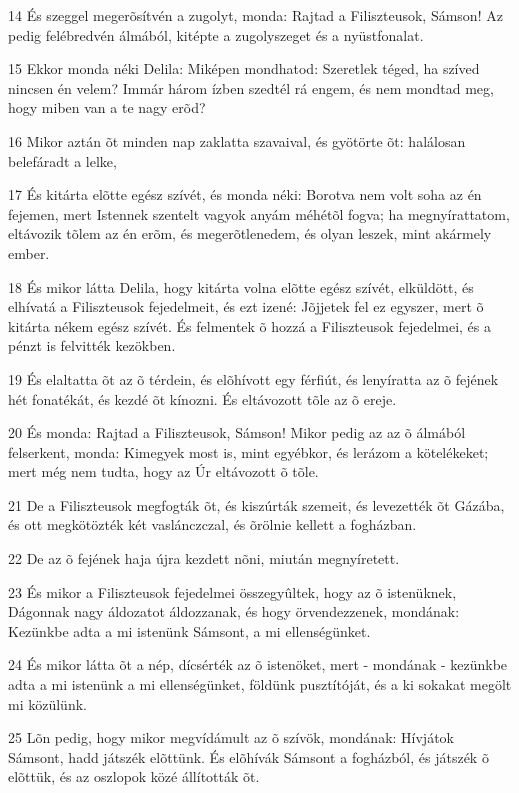 \par 14 És szeggel megerõsítvén a zugolyt, monda: Rajtad a Filiszteusok, Sámson! Az pedig felébredvén álmából, kitépte a zugolyszeget és a nyüstfonalat.
\par 15 Ekkor monda néki Delila: Miképen mondhatod: Szeretlek téged, ha szíved nincsen én velem? Immár három ízben szedtél rá engem, és nem mondtad meg, hogy miben van a te nagy erõd?
\par 16 Mikor aztán õt minden nap zaklatta szavaival, és gyötörte õt: halálosan belefáradt a lelke,
\par 17 És kitárta elõtte egész szívét, és monda néki: Borotva nem volt soha az én fejemen, mert Istennek szentelt vagyok anyám méhétõl fogva; ha megnyírattatom, eltávozik tõlem az én erõm, és megerõtlenedem, és olyan leszek, mint akármely ember.
\par 18 És mikor látta Delila, hogy kitárta volna elõtte egész szívét, elküldött, és elhívatá a Filiszteusok fejedelmeit, és ezt izené: Jõjjetek fel ez egyszer, mert õ kitárta nékem egész szívét. És felmentek õ hozzá a Filiszteusok fejedelmei, és a pénzt is felvitték kezökben.
\par 19 És elaltatta õt az õ térdein, és elõhívott egy férfiút, és lenyíratta az õ fejének hét fonatékát, és kezdé õt kínozni. És eltávozott tõle az õ ereje.
\par 20 És monda: Rajtad a Filiszteusok, Sámson! Mikor pedig az az õ álmából felserkent, monda: Kimegyek most is, mint egyébkor, és lerázom a kötelékeket; mert még nem tudta, hogy az Úr eltávozott õ tõle.
\par 21 De a Filiszteusok megfogták õt, és kiszúrták szemeit, és levezették õt Gázába, és ott megkötözték két vaslánczczal, és õrölnie kellett  a fogházban.
\par 22 De az õ fejének haja újra kezdett nõni, miután megnyíretett.
\par 23 És mikor a Filiszteusok fejedelmei összegyûltek, hogy az õ istenüknek, Dágonnak nagy áldozatot áldozzanak, és hogy örvendezzenek, mondának: Kezünkbe adta a mi istenünk Sámsont, a mi ellenségünket.
\par 24 És mikor látta õt a nép, dícsérték az õ istenöket, mert - mondának - kezünkbe adta a mi istenünk a mi ellenségünket, földünk pusztítóját, és a ki sokakat megölt mi közülünk.
\par 25 Lõn pedig, hogy mikor megvídámult az õ szívök, mondának: Hívjátok Sámsont, hadd játszék elõttünk. És elõhívák Sámsont a fogházból, és játszék õ elõttük, és az oszlopok közé állították õt.
